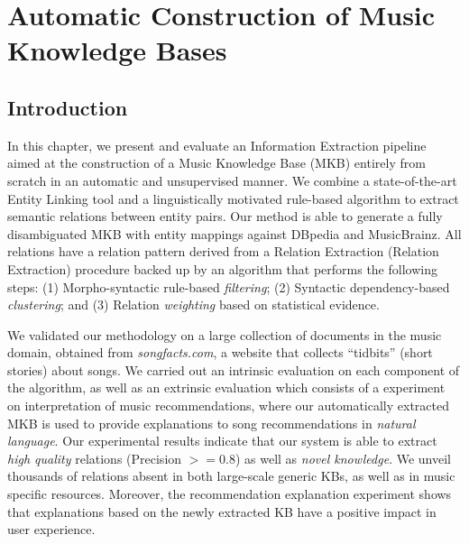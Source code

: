
\chapter{Automatic Construction of Music Knowledge Bases}
\label{sec:kb}

\section{Introduction}\label{sec:kb:introduction}

In this chapter, we present and evaluate an Information Extraction pipeline aimed at the construction of a Music Knowledge Base (MKB) entirely from scratch in an automatic and unsupervised manner.
We combine a state-of-the-art Entity Linking tool and a linguistically motivated rule-based algorithm to extract semantic relations between entity pairs. 
Our method is able to generate a fully disambiguated MKB with entity mappings against DBpedia and MusicBrainz. All relations have a relation pattern derived from a Relation Extraction (Relation Extraction) procedure backed up by an algorithm that performs the following steps: (1) Morpho-syntactic rule-based \textit{filtering}; (2) Syntactic dependency-based \textit{clustering}; and (3) Relation \textit{weighting} based on statistical evidence. 

We validated our methodology on a large collection of documents in the music domain, obtained from \textit{songfacts.com}, a website that collects ``tidbits'' (short stories) about songs.
We carried out an intrinsic evaluation on each component of the algorithm, as well as an extrinsic evaluation which consists of a experiment on interpretation of music recommendations, where our automatically extracted MKB is used to provide explanations to song recommendations in \textit{natural language}.
Our experimental results indicate that our system is able to extract \textit{high quality} relations (Precision $>= 0.8$) as well as \textit{novel knowledge}. We unveil thousands of relations absent in both large-scale generic KBs, as well as in music specific resources. Moreover, the recommendation explanation experiment shows that explanations based on the newly extracted KB have a positive impact in user experience.


